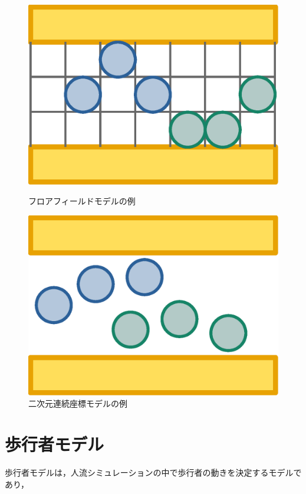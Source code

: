 \begin{figure}[htbp]
    \begin{minipage}[b]{0.5\linewidth}
      \centering
      \includegraphics[keepaspectratio, scale=0.23]{figure/floormodel_ex.eps}
      \caption{フロアフィールドモデルの例}
      \label{fig:serumaton}
    \end{minipage}
    \begin{minipage}[b]{0.5\linewidth}
      \centering
      \includegraphics[keepaspectratio, scale=0.23]{figure/renzoku_model_ex.eps}
      \caption{二次元連続座標モデルの例}
      \label{fig:renzoku}
    \end{minipage}
\end{figure}

\section{歩行者モデル}
歩行者モデルは，人流シミュレーションの中で歩行者の動きを決定するモデルであり，



